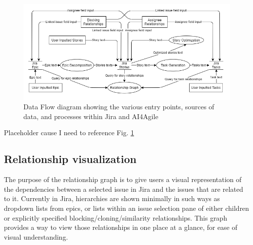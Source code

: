 \begin{figure}
\centering
\includegraphics[width=\textwidth,keepaspectratio]{./figure/DataflowDiagram.png}
\caption{Data Flow diagram showing the various entry points, sources of data, and processes within Jira and AI4Agile}
\label{fig:DataFlowDiagram}
\end{figure}
Placeholder cause I need to reference Fig. \ref{fig:DataFlowDiagram}

\subsection{Relationship visualization}
The purpose of the relationship graph is to give users a visual representation of the dependencies between a selected issue in Jira and the issues that are related to it. Currently in Jira, hierarchies are shown minimally in such ways as dropdown lists from epics, or lists within an issue selection pane of either children or explicitly specified blocking/cloning/similarity relationships. This graph provides a way to view those relationships in one place at a glance, for ease of visual understanding.

